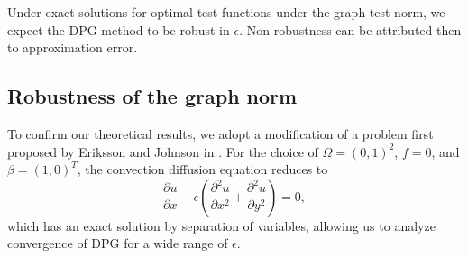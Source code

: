 \documentclass[11pt,onecolumn]{scrartcl}
\newcommand{\pd}[2]{\frac{\partial#1}{\partial#2}}
\newcommand{\pdd}[2]{\frac{\partial^2#1}{\partial#2^2}}
\begin{document}


Under exact solutions for optimal test functions under the graph test norm, we expect the DPG method to be robust in $\epsilon$.  Non-robustness can be attributed then to approximation error.  

\subsection{Robustness of the graph norm}

To confirm our theoretical results, we adopt a modification of a problem first proposed by Eriksson and Johnson in \cite{Eriksson1993}. For the choice of $\Omega = (0,1)^2$, $f=0$, and $\beta = (1,0)^T$, the convection diffusion equation reduces to
\[
\pd{u}{x} - \epsilon \left(\pdd{u}{x}+ \pdd{u}{y}\right) = 0,
\]
which has an exact solution by separation of variables, allowing us to analyze convergence of DPG for a wide range of $\epsilon$.  
\end{document}
